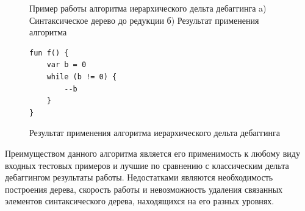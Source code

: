 \begin{figure}[h]
\caption{Пример работы алгоритма иерархического дельта дебаггинга a) Синтаксическое дерево до редукции б) Результат применения алгоритма}
\label{ex:hdd}
\end{figure}

\begin{figure}
\begin{lstlisting}
fun f() {
    var b = 0
    while (b != 0) {
        --b
    }
}
\end{lstlisting}
\caption{\label{ex2:hdd}Результат применения алгоритма иерархического дельта дебаггинга}
\end{figure}

Преимуществом данного алгоритма является его применимость к любому виду входных тестовых примеров и лучшие по сравнению с классическим дельта дебаггингом результаты работы. Недостатками являются необходимость построения дерева, скорость работы и невозможность удаления связанных элементов синтаксического дерева, находящихся на его разных уровнях.


